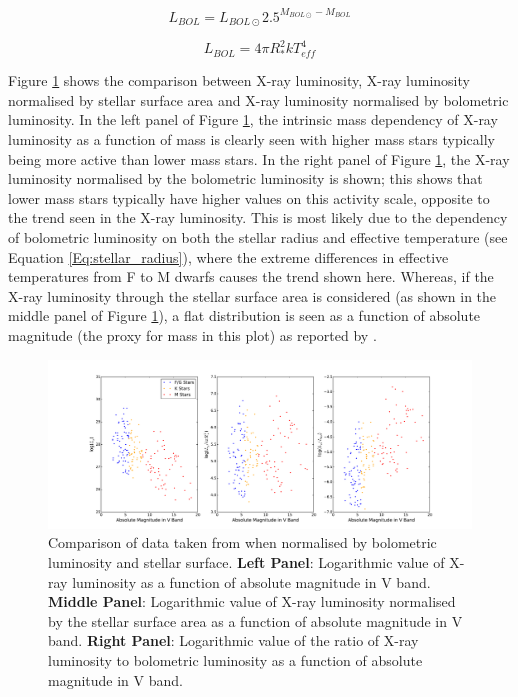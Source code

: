 \begin{equation}
    L_{BOL} = L_{BOL\odot} 2.5^{M_{BOL\odot} - M_{BOL}}
    \label{Eq:bolometric_luminosity}
\end{equation}

\begin{equation}
    L_{BOL} = 4\pi R_{*}^{2}kT_{eff}^{4}
    \label{Eq:stellar_radius}
\end{equation}

Figure \ref{fig:Lx_normalise_schmitt_data} shows the comparison between X-ray luminosity, X-ray luminosity normalised by stellar surface area and X-ray luminosity normalised by bolometric luminosity. In the left panel of Figure \ref{fig:Lx_normalise_schmitt_data}, the intrinsic mass dependency of X-ray luminosity as a function of mass is clearly seen with higher mass stars typically being more active than lower mass stars. In the right panel of Figure \ref{fig:Lx_normalise_schmitt_data}, the X-ray luminosity normalised by the bolometric luminosity is shown; this shows that lower mass stars typically have higher values on this activity scale, opposite to the trend seen in the X-ray luminosity. This is most likely due to the dependency of bolometric luminosity on both the stellar radius and effective temperature (see Equation \ref{Eq:stellar_radius}), where the extreme differences in effective temperatures from F to M dwarfs causes the trend shown here. Whereas, if the X-ray luminosity through the stellar surface area is considered (as shown in the middle panel of Figure \ref{fig:Lx_normalise_schmitt_data}), a flat distribution is seen as a function of absolute magnitude (the proxy for mass in this plot) as reported by \citet{Schmitt_Liefke_2004}.

\begin{figure}
    \centering
    \includegraphics[scale=0.33]{Figures/3-Xray_age/normalise_schmitt_data.pdf}
    \caption[Comparison of X-ray luminosity and normalised parameters]{Comparison of data taken from \citet{Schmitt_Liefke_2004} when normalised by bolometric luminosity and stellar surface. \textbf{Left Panel}: Logarithmic value of X-ray luminosity as a function of absolute magnitude in V band. \textbf{Middle Panel}: Logarithmic value of X-ray luminosity normalised by the stellar surface area as a function of absolute magnitude in V band. \textbf{Right Panel}: Logarithmic value of the ratio of X-ray luminosity to bolometric luminosity as a function of absolute magnitude in V band.}
    \label{fig:Lx_normalise_schmitt_data}
\end{figure}

